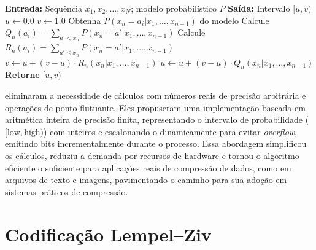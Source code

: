 %
\begin{algorithm}
\caption{Codificação Aritmética}
\label{alg:arithmetic_coding}
\begin{algorithmic}[1]
\State \textbf{Entrada:} Sequência \( x_1, x_2, \dots, x_N \); modelo probabilístico \( P \)
\State \textbf{Saída:} Intervalo \( [u, v) \)
\State \( u \gets 0.0 \)
\State \( v \gets 1.0 \)
    \State Obtenha \( P(x_n = a_i | x_1, \dots, x_{n-1}) \) do modelo
    \State Calcule \( Q_n(a_i) = \sum_{a' < x_n} P(x_n = a' | x_1, \dots, x_{n-1}) \)
    \State Calcule \( R_n(a_i) = \sum_{a' \leq x_n} P(x_n = a' | x_1, \dots, x_{n-1}) \)
    \State \( v \gets u + (v - u) \cdot R_n(x_n | x_1, \dots, x_{n-1}) \)
    \State \( u \gets u + (v - u) \cdot Q_n(x_n | x_1, \dots, x_{n-1}) \)
\EndFor
\State \textbf{Retorne} \( [u, v) \)
\end{algorithmic}
\end{algorithm}


\textcite{Witten1987} eliminaram a necessidade de cálculos com números reais de
precisão arbitrária e operações de ponto flutuante. Eles propuseram uma
implementação baseada em aritmética inteira de precisão finita, representando o
intervalo de probabilidade ($[\text{low}, \text{high})$) com inteiros e
escalonando-o dinamicamente para evitar \emph{overflow}, emitindo bits
incrementalmente durante o processo. Essa abordagem simplificou os cálculos,
reduziu a demanda por recursos de hardware e tornou o algoritmo eficiente o
suficiente para aplicações reais de compressão de dados, como em arquivos de
texto e imagens, pavimentando o caminho para sua adoção em sistemas práticos de
compressão.








\section{Codificação Lempel--Ziv}

